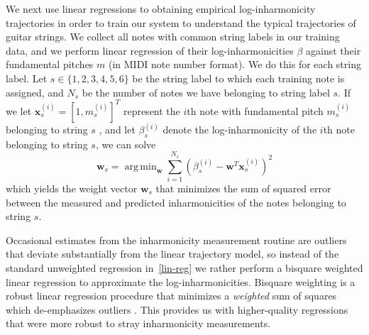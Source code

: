 \documentclass[convention,peer-reviewed]{aesconf}
\DeclareMathOperator*{\argmin}{arg\,min}
\begin{document}
We next use linear regressions to obtaining empirical log-inharmonicity trajectories in order to train our system to understand the typical trajectories of guitar strings. We collect all notes with common string labels in our training data, and we perform linear regression of their log-inharmonicities $\beta$ against their fundamental pitches $m$ (in MIDI note number format). We do this for each string label. Let $s \in \{1,2,3,4,5,6\}$ be the string label to which each training note is assigned, and $N_s$ be the number of notes we have belonging to string label $s$. If we let $\mathbf{x}_s^{(i)} = [1, m_s^{(i)}]^T$ represent the $i$th note with fundamental pitch $m^{(i)}_s$ belonging to string $s$ , and let $\beta_s^{(i)}$ denote the log-inharmonicity of the $i$th note belonging to string $s$, we can solve
\begin{equation}
\label{lin-reg}
\mathbf{w}_s = \argmin_{\mathbf{w}}{\sum_{i=1}^{N_s}{(\beta^{(i)}_s - \mathbf{w}^T\mathbf{x}^{(i)}_s)^2}}
\end{equation}
which yields the weight vector $\mathbf{w}_s$ that minimizes the sum of squared error between the measured and predicted inharmonicities of the notes belonging to string $s$.

Occasional estimates from the inharmonicity measurement routine are outliers that deviate substantially from the linear trajectory model, so instead of the standard unweighted regression in~\eqref{lin-reg} we rather perform a bisquare weighted linear regression to approximate the log-inharmonicities. Bisquare weighting is a robust linear regression procedure that minimizes a \textit{weighted} sum of squares which de-emphasizes outliers \citep{matlab-robustfit}. This provides us with higher-quality regressions that were more robust to stray inharmonicity measurements.
\end{document}
